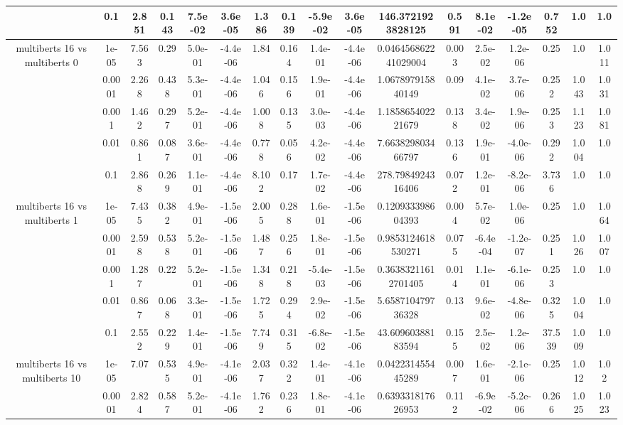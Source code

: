 \begin{tabular}{|c|c|c|c|c|c|c|c|c|c|c|c|c|c|c|c|c|}
 & 0.1 & 2.851 & 0.143 & 7.5e-02 & 3.6e-05 & 1.386 & 0.139 & -5.9e-02 & 3.6e-05 & 146.3721923828125 & 0.591 & 8.1e-02 & -1.2e-05 & 0.752 & 1.0 & 1.0 \\
\hline
\multirow{5}{*}{multiberts 16 vs multiberts 0} & 1e-05 & 7.563 & 0.29 & 5.0e-01 & -4.4e-06 & 1.84 & 0.164 & 1.4e-01 & -4.4e-06 & 0.046456862241029004 & 0.003 & 2.5e-02 & 1.2e-06 & 0.25 & 1.0 & 1.011 \\
 & 0.0001 & 2.268 & 0.438 & 5.3e-01 & -4.4e-06 & 1.046 & 0.156 & 1.9e-01 & -4.4e-06 & 1.067897915840149 & 0.09 & 4.1e-02 & 3.7e-06 & 0.252 & 1.043 & 1.031 \\
 & 0.001 & 1.462 & 0.297 & 5.2e-01 & -4.4e-06 & 1.008 & 0.135 & 3.0e-03 & -4.4e-06 & 1.185865402221679 & 0.138 & 3.4e-02 & 1.9e-06 & 0.253 & 1.123 & 1.081 \\
 & 0.01 & 0.861 & 0.087 & 3.6e-01 & -4.4e-06 & 0.778 & 0.056 & 4.2e-02 & -4.4e-06 & 7.663829803466797 & 0.136 & 1.9e-01 & -4.0e-06 & 0.292 & 1.004 & 1.0 \\
 & 0.1 & 2.868 & 0.269 & 1.1e-01 & -4.4e-06 & 8.102 & 0.17 & 1.7e-02 & -4.4e-06 & 278.7984924316406 & 0.072 & 1.2e-01 & -8.2e-06 & 3.736 & 1.0 & 1.0 \\
\hline
\multirow{5}{*}{multiberts 16 vs multiberts 1} & 1e-05 & 7.435 & 0.382 & 4.9e-01 & -1.5e-06 & 2.005 & 0.288 & 1.6e-01 & -1.5e-06 & 0.120933398604393 & 0.004 & 5.7e-02 & 1.0e-06 & 0.25 & 1.0 & 1.064 \\
 & 0.0001 & 2.598 & 0.538 & 5.2e-01 & -1.5e-06 & 1.487 & 0.256 & 1.8e-01 & -1.5e-06 & 0.9853124618530271 & 0.075 & -6.4e-04 & -1.2e-07 & 0.251 & 1.026 & 1.007 \\
 & 0.001 & 1.287 & 0.22 & 5.2e-01 & -1.5e-06 & 1.348 & 0.218 & -5.4e-03 & -1.5e-06 & 0.36383211612701405 & 0.014 & 1.1e-01 & -6.1e-06 & 0.253 & 1.0 & 1.0 \\
 & 0.01 & 0.867 & 0.068 & 3.3e-01 & -1.5e-06 & 1.725 & 0.294 & 2.9e-02 & -1.5e-06 & 5.658710479736328 & 0.13 & 9.6e-02 & -4.8e-06 & 0.325 & 1.004 & 1.0 \\
 & 0.1 & 2.552 & 0.229 & 1.4e-01 & -1.5e-06 & 7.749 & 0.315 & -6.8e-02 & -1.5e-06 & 43.60960388183594 & 0.155 & 2.5e-02 & 1.2e-06 & 37.539 & 1.009 & 1.0 \\
\hline
\multirow{5}{*}{multiberts 16 vs multiberts 10} & 1e-05 & 7.07 & 0.535 & 4.9e-01 & -4.1e-06 & 2.037 & 0.322 & 1.4e-01 & -4.1e-06 & 0.042231455445289 & 0.007 & 1.6e-01 & -2.1e-06 & 0.25 & 1.012 & 1.02 \\
 & 0.0001 & 2.824 & 0.587 & 5.2e-01 & -4.1e-06 & 1.762 & 0.236 & 1.8e-01 & -4.1e-06 & 0.639331817626953 & 0.112 & -6.9e-02 & -5.2e-06 & 0.266 & 1.025 & 1.023 \\

\end{tabular}
